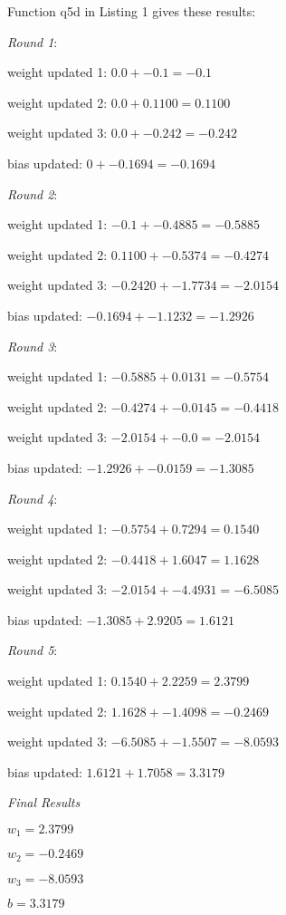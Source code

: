 \documentclass[12pt, fullpage,letterpaper]{article}
\begin{document}
\begin{enumerate}
\begin{enumerate}
	Function q5d in Listing 1 gives these results:
	
	\emph{Round 1}:
	
	weight updated 1: $0.0 + -0.1 = -0.1$
	
	weight updated 2: $0.0 + 0.1100 = 0.1100$
    
    weight updated 3: $0.0 + -0.242 = -0.242$
    
    bias updated: $0 + -0.1694 = -0.1694$
    
    \emph{Round 2}:
    
    weight updated 1: $-0.1 + -0.4885 = -0.5885$
    
    weight updated 2: $0.1100 + -0.5374 = -0.4274$
    
    weight updated 3: $-0.2420 + -1.7734 = -2.0154$
    
    bias updated: $-0.1694 + -1.1232 = -1.2926$
    
    \emph{Round 3}:
    
    weight updated 1: $-0.5885 + 0.0131 = -0.5754$
    
    weight updated 2: $-0.4274 + -0.0145 = -0.4418$
    
    weight updated 3: $-2.0154 + -0.0 = -2.0154$
    
    bias updated: $-1.2926 + -0.0159 = -1.3085$
    
    \emph{Round 4}:
    
    weight updated 1: $-0.5754 + 0.7294 = 0.1540$
    
    weight updated 2: $-0.4418 + 1.6047 = 1.1628$
    
    weight updated 3: $-2.0154 + -4.4931 = -6.5085$
    
    bias updated: $-1.3085 + 2.9205 = 1.6121$
    
    \emph{Round 5}:
    
    weight updated 1: $0.1540 + 2.2259 = 2.3799$
    
    weight updated 2: $1.1628 + -1.4098 = -0.2469$
    
    weight updated 3: $-6.5085 + -1.5507 = -8.0593$
    
    bias updated: $1.6121 + 1.7058 = 3.3179$
    
    \emph{Final Results}
    
    $w_1 = 2.3799$
    
    $w_2 = -0.2469$
    
    $w_3 = -8.0593$
    
    $b = 3.3179$
	
\end{enumerate}
\end{enumerate}
\end{document}
